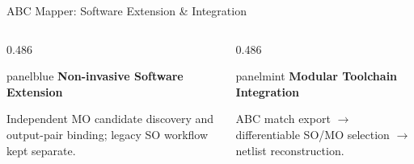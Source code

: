 \documentclass[aspectratio=169,10pt]{beamer}
\newcommand{\smallpanel}[3]{%
  \begin{beamercolorbox}[rounded=true,sep=0.13cm,wd=\linewidth]{#1}%
    {\small\bfseries\color{Accent}#2}\par\vspace{0.06cm}
    {\scriptsize\color{Ink}#3}%
  \end{beamercolorbox}%
}
\begin{document}
\begin{frame}{ABC Mapper: Software Extension \& Integration}
\begin{center}
  \end{center}
  \vspace{0.02cm}
  \begin{columns}[T,onlytextwidth]
    \begin{column}{0.486\textwidth}
      \smallpanel{panelblue}{Non-invasive Software Extension}{%
        Independent MO candidate discovery and output-pair binding; legacy SO workflow kept separate.}
    \end{column}
    \begin{column}{0.486\textwidth}
      \smallpanel{panelmint}{Modular Toolchain Integration}{%
        ABC match export $\rightarrow$ differentiable SO/MO selection $\rightarrow$ netlist reconstruction.}
    \end{column}
  \end{columns}
\end{frame}
\end{document}

